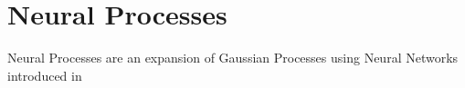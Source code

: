 \documentclass[../main.tex]{subfiles}
\begin{document}
\section{Neural Processes}

Neural Processes are an expansion of Gaussian Processes using Neural Networks introduced in \cite{garnelo2018neural}


\ifSubfilesClassLoaded{%
    \printbibliography{}
}{} 
\end{document}
